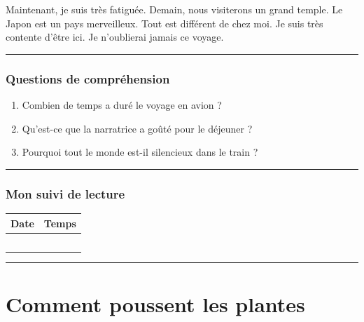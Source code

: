 \documentclass[
  french,
  14pt,
  a4paper,
]{extarticle}
\providecommand{\tightlist}{%
  \setlength{\itemsep}{0pt}\setlength{\parskip}{0pt}}
\begin{document}
Maintenant, je suis très fatiguée. Demain, nous visiterons un grand
temple. Le Japon est un pays merveilleux. Tout est différent de chez
moi. Je suis très contente d'être ici. Je n'oublierai jamais ce voyage.

\begin{center}\rule{0.5\linewidth}{0.5pt}\end{center}

\subsubsection{Questions de
compréhension}\label{questions-de-compruxe9hension-9}

\begin{enumerate}
\def\labelenumi{\arabic{enumi}.}
\tightlist
\item
  Combien de temps a duré le voyage en avion ?
\item
  Qu'est-ce que la narratrice a goûté pour le déjeuner ?
\item
  Pourquoi tout le monde est-il silencieux dans le train ?
\end{enumerate}

\begin{center}\rule{0.5\linewidth}{0.5pt}\end{center}

\subsubsection{Mon suivi de lecture}\label{mon-suivi-de-lecture-9}

\begin{center}
\begin{tabularx}{0.75\textwidth}{|X|X|}
\hline
\textbf{Date} & \textbf{Temps} \\
\hline
& \\
\hline
& \\
\hline
& \\
\hline
& \\
\hline
& \\
\hline
\end{tabularx}
\end{center}

\begin{center}\rule{0.5\linewidth}{0.5pt}\end{center}

\newpage

\section{Comment poussent les
plantes}\label{comment-poussent-les-plantes}
\end{document}
